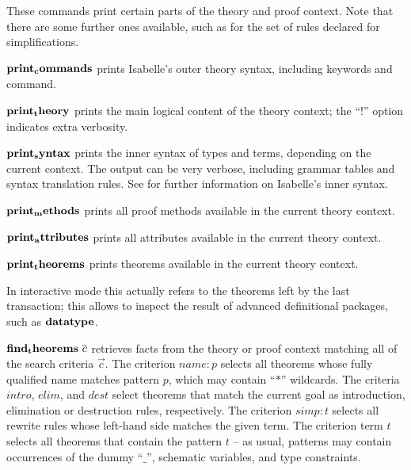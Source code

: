 These commands print certain parts of the theory and proof context.  Note that
there are some further ones available, such as for the set of rules declared
for simplifications.

\begin{descr}
  
\item [${\mathord{\mathbf{print_commands}}}$] prints Isabelle's outer theory syntax,
  including keywords and command.
  
\item [${\mathord{\mathbf{print_theory}}}$] prints the main logical content
  of the theory context; the ``$!$'' option indicates extra verbosity.

\item [${\mathord{\mathbf{print_syntax}}}$] prints the inner syntax of types and
  terms, depending on the current context.  The output can be very verbose,
  including grammar tables and syntax translation rules.  See \cite[\S7,
  \S8]{isabelle-ref} for further information on Isabelle's inner syntax.
  
\item [${\mathord{\mathbf{print_methods}}}$] prints all proof methods available in
  the current theory context.
  
\item [${\mathord{\mathbf{print_attributes}}}$] prints all attributes available in
  the current theory context.
  
\item [${\mathord{\mathbf{print_theorems}}}$] prints theorems available in the
  current theory context.
  
  In interactive mode this actually refers to the theorems left by the last
  transaction; this allows to inspect the result of advanced definitional
  packages, such as ${\mathord{\mathbf{datatype}}}$.

\item [${\mathord{\mathbf{find_theorems}}}~\overline{c}$] retrieves facts from the theory
  or proof context matching all of the search criteria $\vec c$.  The
  criterion $name: p$ selects all theorems whose fully qualified name matches
  pattern $p$, which may contain ``$*$'' wildcards.  The criteria $intro$,
  $elim$, and $dest$ select theorems that match the current goal as
  introduction, elimination or destruction rules, respectively.  The criterion
  $simp: t$ selects all rewrite rules whose left-hand side matches the given
  term.  The criterion term $t$ selects all theorems that contain the pattern
  $t$ -- as usual, patterns may contain occurrences of the dummy ``$\_$'',
  schematic variables, and type constraints.
  

\end{descr}
